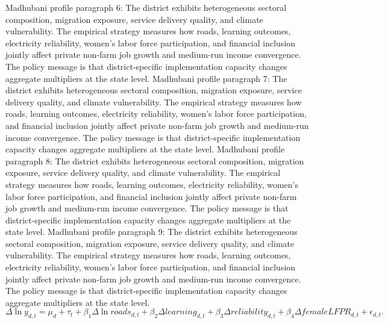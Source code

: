\documentclass[preprint,12pt]{elsarticle}
\begin{document}
Madhubani profile paragraph 6: The district exhibits heterogeneous sectoral composition, migration exposure, service delivery quality, and climate vulnerability. The empirical strategy measures how roads, learning outcomes, electricity reliability, women's labor force participation, and financial inclusion jointly affect private non-farm job growth and medium-run income convergence. The policy message is that district-specific implementation capacity changes aggregate multipliers at the state level.
Madhubani profile paragraph 7: The district exhibits heterogeneous sectoral composition, migration exposure, service delivery quality, and climate vulnerability. The empirical strategy measures how roads, learning outcomes, electricity reliability, women's labor force participation, and financial inclusion jointly affect private non-farm job growth and medium-run income convergence. The policy message is that district-specific implementation capacity changes aggregate multipliers at the state level.
Madhubani profile paragraph 8: The district exhibits heterogeneous sectoral composition, migration exposure, service delivery quality, and climate vulnerability. The empirical strategy measures how roads, learning outcomes, electricity reliability, women's labor force participation, and financial inclusion jointly affect private non-farm job growth and medium-run income convergence. The policy message is that district-specific implementation capacity changes aggregate multipliers at the state level.
Madhubani profile paragraph 9: The district exhibits heterogeneous sectoral composition, migration exposure, service delivery quality, and climate vulnerability. The empirical strategy measures how roads, learning outcomes, electricity reliability, women's labor force participation, and financial inclusion jointly affect private non-farm job growth and medium-run income convergence. The policy message is that district-specific implementation capacity changes aggregate multipliers at the state level.
\begin{equation}\Delta \ln y_{d,t}=\mu_d+\tau_t+\beta_1\Delta\ln roads_{d,t}+\beta_2\Delta learning_{d,t}+\beta_3\Delta reliability_{d,t}+\beta_4\Delta femaleLFPR_{d,t}+\epsilon_{d,t}.\end{equation}
\end{document}
